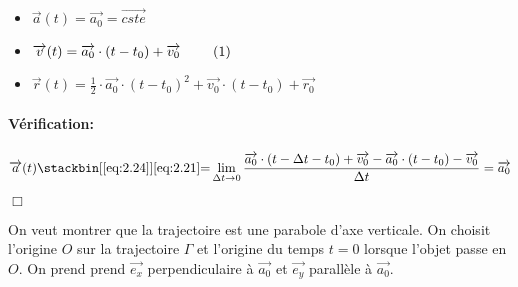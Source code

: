 \documentclass[
    11pt,
    a4paper,
    oneside,
    headinlcude, footinclude,
    twoside,
]{report}
\newcommand{\cqfd}[0]{\begin{flushright}$\Box$\end{flushright}}
\renewcommand{\vec}[1]{\overrightarrow{#1}}
\begin{document}
\begin{enumerate}
\begin{center}
\begin{minipage}{.5\linewidth}
{
}
\end{minipage}
\begin{minipage}{.49\linewidth}
\setlength{\parskip}{.3em}
\begin{itemize}
\item $\vec a (t) =  \vec{a_{0}} = \vec{cste}$
\item $\vec v (t) =  \vec{a_{0}} \cdot (t - t_{0}) +
\vec{v_{0}}\quad \quad~\refstepcounter{equation}(\theequation)
\label{eq:2.24}$
\item $\vec r (t) = \frac{1}{2} \cdot \vec{a_{0}} \cdot (t
- t_{0})^{2} + \vec{v_{0}} \cdot (t - t_{0}) + \vec{r_{0}}$ 
\end{itemize}
\end{minipage}
\end{center}

\paragraph{Vérification:}
        
$$\vec a (t) \stackbin[\eqref{eq:2.24}]{\eqref{eq:2.21}}{=}
\lim_{\Delta t \to 0} \frac{\vec{a_{0}} \cdot (t - \Delta t - t_{0}) +
\vec{v_{0}} - \vec{a_{0}} \cdot (t - t_{0}) - \vec{v_{0}}}{\Delta t} =
\vec{a_{0}}$$
\cqfd 
\end{enumerate}

On veut montrer que la trajectoire est une parabole d'axe verticale. On
choisit l'origine $O$ sur la trajectoire $\Gamma$ et l'origine du temps $t =
0$ lorsque l'objet passe en $O$. On prend prend $\vec{e_{x}}$ perpendiculaire
à $\vec{a_{0}}$ et $\vec{e_{y}}$ parallèle à $\vec{a_{0}}$.
\end{document}
